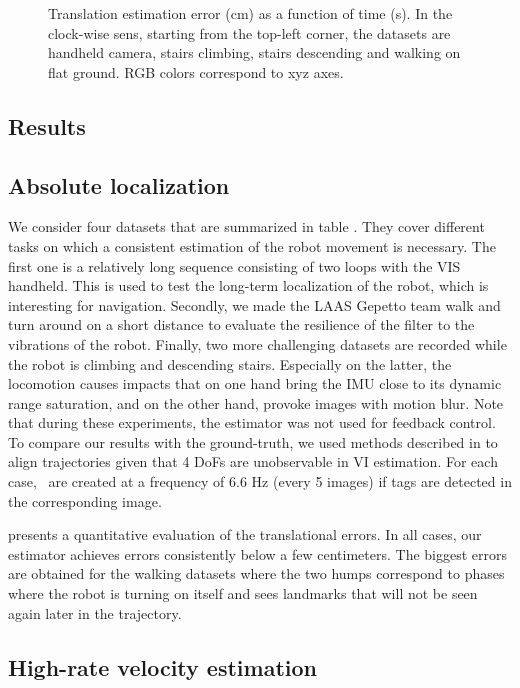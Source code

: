 \begin{figure}[t]
\begin{subfigure}{0.5\textwidth}
     \end{subfigure}%
    \caption{Translation estimation error (cm) as a function of time (s). In the clock-wise sens, starting from the 
             top-left corner, the datasets are handheld camera, stairs climbing, stairs descending and walking on flat ground. 
             RGB colors correspond to xyz axes.}
    \label{fig:results}
\end{figure}

\subsection{Results}

\subsection{Absolute localization}

We consider four datasets that are summarized in table . They cover different tasks on which a consistent 
estimation of the robot movement is necessary. The first one is a relatively long sequence consisting of two loops with the VIS handheld. 
This is used to test the long-term localization of the robot, which is interesting for navigation. Secondly, we made the LAAS Gepetto team 
 walk and turn around on a short distance to evaluate the resilience of the filter to the vibrations of the robot. Finally, two more 
challenging datasets are recorded while the robot is climbing and descending stairs. Especially on the latter, the locomotion causes impacts 
that on one hand bring the IMU close to its dynamic range saturation, and on the other hand, provoke images with motion blur. Note that during these experiments, 
the estimator was not used for feedback control. To compare our results with the ground-truth, we used methods described in \cite{zhang2018tutorial} to align 
trajectories given that 4 DoFs are unobservable in VI estimation.
For each case, \keyframes\ are created at a frequency of 6.6 Hz (every 5 images) if tags are detected in the corresponding image.


 presents a quantitative evaluation of the translational errors. In all cases, our estimator achieves errors consistently below a few centimeters. 
The biggest errors are obtained for the walking datasets where the two humps correspond to phases where the robot is turning on itself and sees landmarks that will not be 
seen again later in the trajectory.

\subsection{High-rate velocity estimation}

